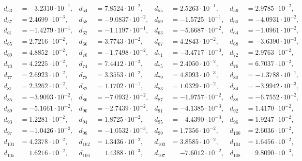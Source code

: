 \begin{align*}
d_{ 53 } &= -3.2310 \cdot 10^{ -1 }, & d_{ 54 } &= 7.8524 \cdot 10^{ -2 }, & d_{ 55 } &= 2.5263 \cdot 10^{ -1 }, & d_{ 56 } &= 2.9785 \cdot 10^{ -2 },\\ 
d_{ 57 } &= 2.4699 \cdot 10^{ -3 }, & d_{ 58 } &= -9.0837 \cdot 10^{ -2 }, & d_{ 59 } &= -1.5725 \cdot 10^{ -1 }, & d_{ 60 } &= -4.0931 \cdot 10^{ -2 },\\ 
d_{ 61 } &= -1.4279 \cdot 10^{ -1 }, & d_{ 62 } &= -1.1197 \cdot 10^{ -1 }, & d_{ 63 } &= -5.6687 \cdot 10^{ -2 }, & d_{ 64 } &= -1.0961 \cdot 10^{ -2 },\\ 
d_{ 65 } &= 2.7216 \cdot 10^{ -2 }, & d_{ 66 } &= 3.7743 \cdot 10^{ -2 }, & d_{ 67 } &= 4.2843 \cdot 10^{ -2 }, & d_{ 68 } &= -3.6390 \cdot 10^{ -3 },\\ 
d_{ 69 } &= 4.8852 \cdot 10^{ -2 }, & d_{ 70 } &= -1.7498 \cdot 10^{ -2 }, & d_{ 71 } &= -3.4717 \cdot 10^{ -3 }, & d_{ 72 } &= 2.9763 \cdot 10^{ -2 },\\ 
d_{ 73 } &= 4.2225 \cdot 10^{ -2 }, & d_{ 74 } &= 7.4412 \cdot 10^{ -2 }, & d_{ 75 } &= 2.4050 \cdot 10^{ -2 }, & d_{ 76 } &= 6.7037 \cdot 10^{ -2 },\\ 
d_{ 77 } &= 2.6923 \cdot 10^{ -2 }, & d_{ 78 } &= 3.3553 \cdot 10^{ -2 }, & d_{ 79 } &= 4.8093 \cdot 10^{ -3 }, & d_{ 80 } &= -1.3788 \cdot 10^{ -1 },\\ 
d_{ 81 } &= 2.3262 \cdot 10^{ -2 }, & d_{ 82 } &= 1.1702 \cdot 10^{ -1 }, & d_{ 83 } &= 1.0329 \cdot 10^{ -2 }, & d_{ 84 } &= -3.9942 \cdot 10^{ -3 },\\ 
d_{ 85 } &= -3.9093 \cdot 10^{ -2 }, & d_{ 86 } &= -7.0932 \cdot 10^{ -2 }, & d_{ 87 } &= -1.9757 \cdot 10^{ -2 }, & d_{ 88 } &= -6.7552 \cdot 10^{ -2 },\\ 
d_{ 89 } &= -5.1661 \cdot 10^{ -2 }, & d_{ 90 } &= -2.7439 \cdot 10^{ -2 }, & d_{ 91 } &= -4.1385 \cdot 10^{ -3 }, & d_{ 92 } &= 1.4170 \cdot 10^{ -2 },\\ 
d_{ 93 } &= 1.2281 \cdot 10^{ -2 }, & d_{ 94 } &= 1.8725 \cdot 10^{ -2 }, & d_{ 95 } &= -4.4390 \cdot 10^{ -3 }, & d_{ 96 } &= 1.9247 \cdot 10^{ -2 },\\ 
d_{ 97 } &= -1.0426 \cdot 10^{ -2 }, & d_{ 98 } &= -1.0532 \cdot 10^{ -3 }, & d_{ 99 } &= 1.7356 \cdot 10^{ -2 }, & d_{ 100 } &= 2.6036 \cdot 10^{ -2 },\\ 
d_{ 101 } &= 4.2378 \cdot 10^{ -2 }, & d_{ 102 } &= 1.3436 \cdot 10^{ -2 }, & d_{ 103 } &= 3.8585 \cdot 10^{ -2 }, & d_{ 104 } &= 1.6456 \cdot 10^{ -2 },\\ 
d_{ 105 } &= 1.6216 \cdot 10^{ -2 }, & d_{ 106 } &= 1.4388 \cdot 10^{ -3 }, & d_{ 107 } &= -7.6012 \cdot 10^{ -2 }, & d_{ 108 } &= 9.8090 \cdot 10^{ -3 },\\ 

\end{align*}
